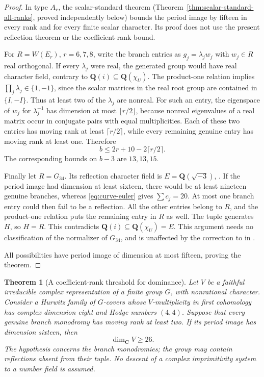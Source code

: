 \documentclass[11pt]{article}
\newtheorem{theorem}{Theorem}[section]
\theoremstyle{definition}
\theoremstyle{remark}
\newcommand{\Q}{\mathbf Q}
\newcommand{\C}{\mathbf C}
\begin{document}
\begin{proof}
In type $A_r$, the scalar-standard theorem
(Theorem~\ref{thm:scalar-standard-all-ranks}, proved independently
below) bounds the period image by fifteen in every rank and for
every finite scalar character.  Its proof does not use the
present reflection theorem or the coefficient-rank bound.

For $R=W(E_r)$, $r=6,7,8$, write the branch entries as
$g_j=\lambda_j w_j$ with $w_j\in R$ real orthogonal.
If every $\lambda_j$ were real, the generated group would have
real character field, contrary to $\Q(i)\subseteq\Q(\chi_U)$.
The product-one relation implies
$\prod_j\lambda_j\in\{1,-1\}$, since the scalar matrices
in the real root group are contained in $\{I,-I\}$.
Thus at least two of the $\lambda_j$ are nonreal.
For such an entry, the eigenspace of $w_j$ for
$\lambda_j^{-1}$ has dimension at most $\lfloor r/2\rfloor$,
because nonreal eigenvalues of a real matrix occur in conjugate
pairs with equal multiplicities.  Each of these two entries has
moving rank at least $\lceil r/2\rceil$, while every remaining
genuine entry has moving rank at least one.  Therefore
\[
 b\leq2r+10-2\lceil r/2\rceil.
\]
The corresponding bounds on $b-3$ are $13,13,15$.

Finally let $R=G_{34}$.  Its reflection character field is
$E=\Q(\sqrt{-3})$,
\cite[Table~8.2, p.~675; the $G_{34}$ discussion on p.~661]{MalleFields}.
If the period image had dimension at least sixteen, there would
be at least nineteen genuine branches, whereas
\eqref{eq:curve-euler} gives $\sum c_j=20$.
At most one branch entry could then fail to be a reflection.
All the other entries belong to $R$, and the product-one
relation puts the remaining entry in $R$ as well.
The tuple generates $H$, so $H=R$.  This contradicts
$\Q(i)\subseteq\Q(\chi_U)=E$.
This argument needs no classification of the normalizer of
$G_{34}$, and is unaffected by the correction to
\cite[(5.14)]{CohenReflection} in \cite{CohenCorrection}.

All possibilities have period image of dimension at most
fifteen, proving the theorem.
\end{proof}


\begin{theorem}[A coefficient-rank threshold for dominance]\label{thm:finite-cover-rank}
Let $V$ be a faithful irreducible complex representation of a finite group $G$, with nonrational character. Consider a Hurwitz family of $G$-covers whose $V$-multiplicity in first cohomology has complex dimension eight and Hodge numbers $(4,4)$. Suppose that every genuine branch monodromy has moving rank at least two. If its period image has dimension sixteen, then
\[
 \dim_{\C}V\ge26.
\]
The hypothesis concerns the branch monodromies; the group may contain reflections absent from their tuple. No descent of a complex imprimitivity system to a number field is assumed.
\end{theorem}
\end{document}
